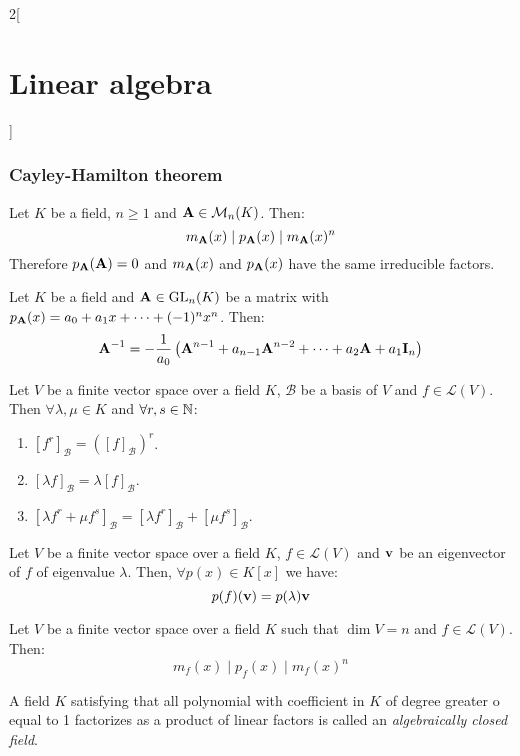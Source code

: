 \documentclass[../../../main_math.tex]{subfiles}
\begin{document}
\begin{multicols}{2}[\section{Linear algebra}]
  \subsubsection{Cayley-Hamilton theorem}
  \begin{theorem}
    Let $K$ be a field, $n\geq 1$ and $\boldsymbol{\mathrm{A}}\in\mathcal{M}_n(K)$. Then: $$m_{\boldsymbol{\mathrm{A}}}(x)\mid p_{\boldsymbol{\mathrm{A}}}(x)\mid m_{\boldsymbol{\mathrm{A}}}(x)^n$$ Therefore $p_{\boldsymbol{\mathrm{A}}}(\boldsymbol{\mathrm{A}})=0$ and $m_{\boldsymbol{\mathrm{A}}}(x)$ and $p_{\boldsymbol{\mathrm{A}}}(x)$ have the same irreducible factors.
  \end{theorem}
  \begin{corollary}
    Let $K$ be a field and $\boldsymbol{\mathrm{A}}\in\mathrm{GL}_n(K)$ be a matrix with $p_{\boldsymbol{\mathrm{A}}}(x)=a_0+a_1x+\cdots+(-1)^nx^n$. Then: $$\boldsymbol{\mathrm{A}}^{-1}=-\frac{1}{a_0}\left(\boldsymbol{\mathrm{A}}^{n-1}+a_{n-1}\boldsymbol{\mathrm{A}}^{n-2}+\cdots+a_2\boldsymbol{\mathrm{A}}+a_1\boldsymbol{\mathrm{I}}_n\right)$$
  \end{corollary}
  \begin{lemma}
    Let $V$ be a finite vector space over a field $K$, $\mathcal{B}$ be a basis of $V$ and $f\in\mathcal{L}(V)$. Then $\forall\lambda,\mu\in K$ and $\forall r,s\in\mathbb{N}$:
    \begin{enumerate}
      \item $[f^r]_\mathcal{B}={\left([f]_\mathcal{B}\right)}^r$.
      \item $[\lambda f]_\mathcal{B}=\lambda[f]_\mathcal{B}$.
      \item $[\lambda f^r+\mu f^s]_\mathcal{B}=[\lambda f^r]_\mathcal{B}+[\mu f^s]_\mathcal{B}$.
    \end{enumerate}
  \end{lemma}
  \begin{lemma}
    Let $V$ be a finite vector space over a field $K$, $f\in\mathcal{L}(V)$ and $\boldsymbol{\mathrm{v}}$ be an eigenvector of $f$ of eigenvalue $\lambda$. Then, $\forall p(x)\in K[x]$ we have: $$p(f)(\boldsymbol{\mathrm{v}})=p(\lambda)\boldsymbol{\mathrm{v}}$$
  \end{lemma}
  \begin{theorem}
    Let $V$ be a finite vector space over a field $K$ such that $\dim V=n$ and $f\in\mathcal{L}(V)$. Then: $$m_f(x)\mid p_f(x)\mid m_f(x)^n$$
  \end{theorem}
  \begin{definition}
    A field $K$ satisfying that all polynomial with coefficient in $K$ of degree greater o equal to 1 factorizes as a product of linear factors is called an \emph{algebraically closed field}.
  \end{definition}
  \begin{definition}

\end{definition}
\end{multicols}
\end{document}
